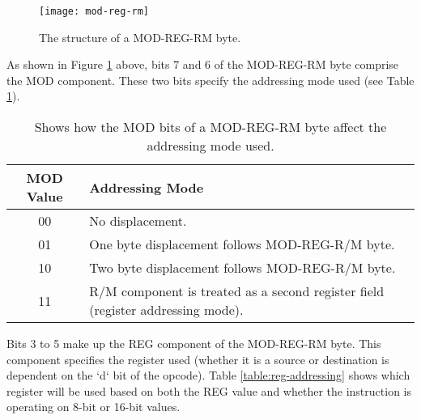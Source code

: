         \begin{figure}[h]
            \centering
            \texttt{[image: mod-reg-rm]}
            \caption{The structure of a MOD-REG-RM byte.}
            \label{figure:mod-reg-rm}
        \end{figure}

        As shown in Figure \ref{figure:mod-reg-rm} above, bits 7 and 6 of the MOD-REG-RM byte comprise the MOD component. These two bits specify the addressing mode used (see Table \ref{table:mod-addressing-mode}).

        \begin{table}[h]
            \centering
            \begin{tabular} { | c | m{} | }
                \hline
                MOD Value & Addressing Mode \\
                \hline
                00  & No displacement. \\
                01  & One byte displacement follows MOD-REG-R/M byte. \\
                10  & Two byte displacement follows MOD-REG-R/M byte. \\
                11  & R/M component is treated as a second register field (register addressing mode). \\
                \hline
            \end{tabular}
            \caption{Shows how the MOD bits of a MOD-REG-RM byte affect the addressing mode used.}
            \label{table:mod-addressing-mode}
        \end{table}

        Bits 3 to 5 make up the REG component of the MOD-REG-RM byte. This component specifies the register used (whether it is a source or destination is dependent on the `d` bit of the opcode). Table \ref{table:reg-addressing} shows which register will be used based on both the REG value and whether the instruction is operating on 8-bit or 16-bit values.

